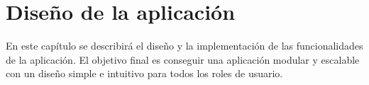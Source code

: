 \chapter{Diseño de la aplicación}
\noindent
En este capítulo se describirá el diseño y la implementación de las funcionalidades de la aplicación. El objetivo final es conseguir una aplicación modular y escalable con un diseño simple e intuitivo para todos los roles de usuario.


